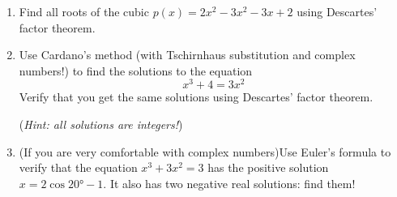 \begin{exercises}{}{}
\begin{enumerate}
		
		\item Find all roots of the cubic $p(x)=2x^2-3x^2-3x+2$ using Descartes' factor theorem.
		
		
		\item Use Cardano's method (with Tschirnhaus substitution and complex numbers!) to find the solutions to the equation
		\[
			x^3+4=3x^2
		\]
		Verify that you get the same solutions using Descartes' factor theorem.\par
		(\emph{Hint: all solutions are integers!})
	  
		
		\item (If you are very comfortable with complex numbers)\lstsp Use Euler's formula to verify that the equation $x^3+3x^2=3$ has the positive solution $x=2\cos\ang{20}-1$. It also has two negative real solutions: find them! 
	\end{enumerate}
\end{exercises}

\clearpage



